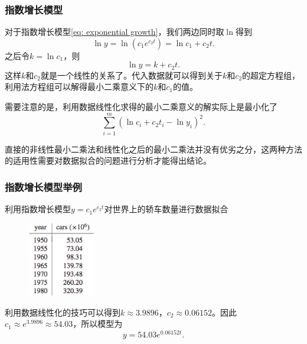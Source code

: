 \documentclass[10pt]{beamer}
\begin{document}
\begin{frame}
\frametitle{指数增长模型}
对于指数增长模型\eqref{eq: exponential growth}，我们两边同时取$\ln$得到
\begin{equation}
\ln y = \ln(c_1 e^{c_2 t}) = \ln c_1 + c_2 t.
\end{equation}
之后令$k = \ln c_1$，则
\begin{equation}
\ln y = k + c_2 t.
\end{equation}
这样$k$和$c_2$就是一个线性的关系了。代入数据就可以得到关于$k$和$c_2$的超定方程组，利用法方程组可以解得最小二乘意义下的$k$和$c_1$的值。

\vspace{0.2cm}

需要注意的是，利用数据线性化求得的最小二乘意义的解实际上是最小化了
\begin{equation}
\sum_{i = 1}^{m}(\ln c_i + c_2 t_i - \ln y_i)^2.
\end{equation}

直接的非线性最小二乘法和线性化之后的最小二乘法并没有优劣之分，这两种方法的适用性需要对数据拟合的问题进行分析才能得出结论。
\end{frame}


\begin{frame}
\frametitle{指数增长模型举例}
\begin{example}
利用指数增长模型$y = c_1 e^{c_2 t}$对世界上的轿车数量进行数据拟合
\begin{figure}
\includegraphics[width=3cm]{figs/4-2-2_Exponential_Growth-1} 
\end{figure}
\end{example}
利用数据线性化的技巧可以得到$k \approx 3.9896$，$c_2 \approx 0.06152$。因此$c_1 \approx e^{3.9896} \approx 54.03$，所以模型为
\begin{equation}
y = 54.03 e^{0.06152t}.
\end{equation}
\end{frame}
\end{document}
